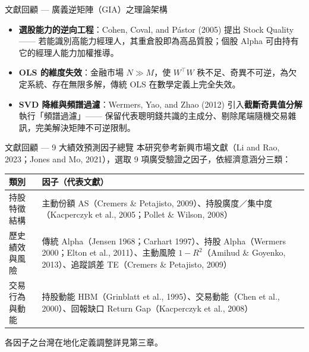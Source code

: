 \documentclass[aspectratio=169,11pt,t]{beamer}   %
\begin{document}
\begin{frame}{文獻回顧 — 廣義逆矩陣（GIA）之理論架構}
\vspace{0.2cm}
\begin{itemize}\setlength{\itemsep}{9pt}
  \item \textbf{選股能力的逆向工程}：Cohen, Coval, and Pástor (2005) 提出 Stock Quality —— 若能識別高能力經理人，其重倉股即為高品質股；個股 Alpha 可由持有它的經理人能力加權推導。
  \item \textbf{OLS 的維度失效}：金融市場 $N \gg M$，使 $W^{\top}W$ 秩不足、奇異不可逆，為欠定系統、存在無限多解，傳統 OLS 在數學定義上完全失效。
  \item \textbf{SVD 降維與頻譜過濾}：Wermers, Yao, and Zhao (2012) 引入\textbf{截斷奇異值分解}執行「頻譜過濾」—— 保留代表聰明錢共識的主成分、剔除尾端隨機交易雜訊，完美解決矩陣不可逆限制。
\end{itemize}
\end{frame}

\begin{frame}{文獻回顧 — 9 大績效預測因子總覽}
\vspace{-0.15cm}
本研究參考新興市場文獻（Li and Rao, 2023；Jones and Mo, 2021），選取 9 項廣受驗證之因子，依經濟意涵分三類：
\vspace{4pt}
\begin{center}\small
\begin{tabular}{>{\raggedright\arraybackslash}p{2.9cm} >{\raggedright\arraybackslash}p{8.8cm}}
\toprule
\textbf{類別} & \textbf{因子（代表文獻）} \\
\midrule
持股特徵結構 & 主動份額 AS（Cremers \& Petajisto, 2009）、持股廣度／集中度（Kacperczyk et al., 2005；Pollet \& Wilson, 2008） \\
歷史績效與風險 & 傳統 Alpha（Jensen 1968；Carhart 1997）、持股 Alpha（Wermers 2000；Elton et al., 2011）、主動風險 $1-R^2$（Amihud \& Goyenko, 2013）、追蹤誤差 TE（Cremers \& Petajisto, 2009） \\
交易行為與動能 & 持股動能 HBM（Grinblatt et al., 1995）、交易動能（Chen et al., 2000）、回報缺口 Return Gap（Kacperczyk et al., 2008） \\
\bottomrule
\end{tabular}
\end{center}
\vspace{2pt}
\hfill{\small\color{softgray}各因子之台灣在地化定義調整詳見第三章。}
\end{frame}
\end{document}
